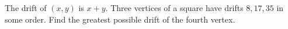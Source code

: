 The drift of $(x,y)$ is $x+y$. Three vertices of a square have drifts $8,17,35$ in some order. Find the greatest possible drift of the fourth vertex.
